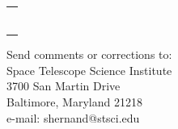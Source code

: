 \begin{titlepage}
\begin{table}[h]
\begin{tabular}{lll}
 
 \multicolumn{3}{c}{ \rule{130mm}{0.8mm}}      \\    
\end{tabular}
\end{table}%


\vspace{120mm}

\begin{flushright}
Send comments or corrections to: \\
Space Telescope Science Institute \\
3700 San Martin Drive \\
Baltimore, Maryland 21218 \\
e-mail: shernand@stsci.edu
 \end{flushright}
\end{titlepage}